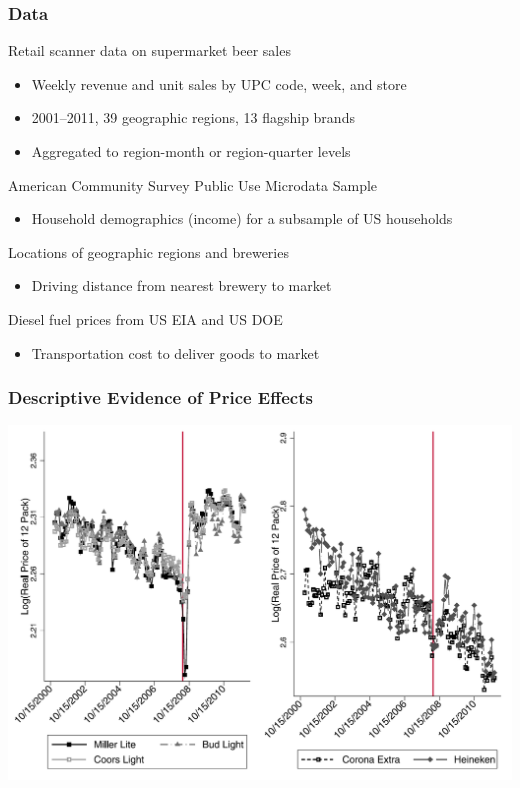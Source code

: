 \documentclass{beamer}
\begin{document}
\begin{frame}\frametitle{Data}
    Retail scanner data on supermarket beer sales
    \begin{itemize}
        \item Weekly revenue and unit sales by UPC code, week, and store
        \item 2001--2011, 39 geographic regions, 13 flagship brands
        \item Aggregated to region-month or region-quarter levels
    \end{itemize}
    \vspace{2ex}
    American Community Survey Public Use Microdata Sample
    \begin{itemize}
        \item Household demographics (income) for a subsample of US households
    \end{itemize}
    \vspace{2ex}
    Locations of geographic regions and breweries
    \begin{itemize}
        \item Driving distance from nearest brewery to market
    \end{itemize}
    \vspace{2ex}
    Diesel fuel prices from US EIA and US DOE
    \begin{itemize}
        \item Transportation cost to deliver goods to market
    \end{itemize}
\end{frame}

\begin{frame}\frametitle{Descriptive Evidence of Price Effects}
    \centering
    \includegraphics[width=0.95\linewidth]{fig_1}
\end{frame}
\end{document}
